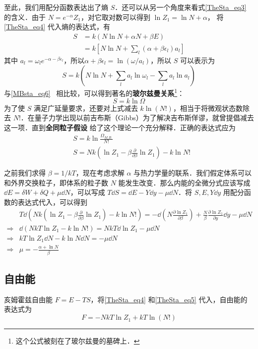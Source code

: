 至此，我们用配分函数表达出了熵 $S$．还可以从另一个角度来看式\autoref{TheSta_eq3} 的含义．由于 $N=e^{-\alpha}Z_1$，对它取对数可以得到 $\ln Z_1=\ln N+\alpha$，
将\autoref{TheSta_eq4} 代入熵的表达式，有
\begin{equation}
\begin{aligned}
S&=k(N\ln N+\alpha N+\beta E)
\\&=k[N\ln N+\sum_l(\alpha+\beta\epsilon_l)a_l]
\end{aligned}
\end{equation}
其中 $a_l=\omega_le^{-\alpha-\beta\epsilon_l}$，所以$\alpha+\beta\epsilon_l=\ln(\omega/a_l)$，所以 $S$ 可以表示为
\begin{equation}
S=k(N\ln N+\sum_l a_l\ln\omega_l-\sum_l a_l\ln a_l)
\end{equation}
与\autoref{MBsta_eq6}~ 相比较，可以得到著名的\textbf{玻尔兹曼关系}\footnote{这个公式被刻在了玻尔兹曼的墓碑上．}：
\begin{equation}
S=k\ln \Omega
\end{equation}
为了使 $S$ 满足广延量要求，还要对上式减去 $k\ln (N!)$，相当于将微观状态数除去 $N!$．在量子力学出现以前吉布斯（Gibbs）为了解决吉布斯佯谬，就曾提倡减去这一项．直到\textbf{全同粒子假设} 给了这个理论一个充分解释．正确的表达式应为
\begin{equation}\label{TheSta_eq5}
\begin{aligned}
&S=k\ln \frac{\Omega_{M.B.}}{N!}\\
&S=Nk(\ln Z_1-\beta\frac{\partial }{\partial \beta}\ln Z_1)-k\ln N!
\end{aligned}
\end{equation}

之前我们求得 $\beta=1/kT$，现在考虑求解 $\alpha$ 与热力学量的联系．我们假定体系可以和外界交换粒子，即体系的粒子数 $N$ 能发生改变．那么内能的全微分式应该写成 $\dd E=\delta W+\delta Q+\mu\dd N$，可以写成 $T\dd S=\dd E-Y\dd y-\mu\dd N$．将 $S,E,Y\dd y$ 用配分函数的表达式代入，可以得到
\begin{equation}
\begin{aligned}
&T\dd(Nk(\ln Z_1-\beta\frac{\partial }{\partial \beta}\ln Z_1)-k\ln N!)=-\dd(N \frac{\partial \ln Z_1}{\partial \beta})+\frac{N}{\beta}\frac{\partial \ln Z_1}{\partial y}\dd y-\mu\dd N\\
\Rightarrow &\dd(NkT\ln Z_1-k\ln N!)=NkT \dd \ln Z_1 -\mu \dd N\\
\Rightarrow & kT\ln Z_1 \dd N-k\ln N\dd N=-\mu\dd N\\
\Rightarrow &\mu=-\frac{\alpha+\ln N}{\beta}
\end{aligned}
\end{equation}


\subsection{自由能}
亥姆霍兹自由能 $F=E-TS$，将\autoref{TheSta_eq4} 和\autoref{TheSta_eq5} 代入，自由能的表达式为
\begin{equation}
F=-NkT\ln Z_1+kT\ln(N!)
\end{equation}
